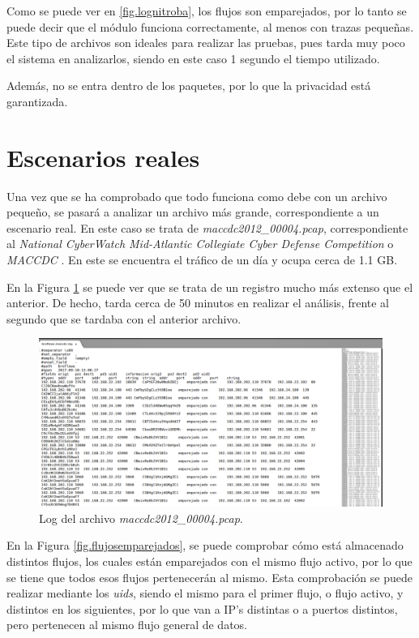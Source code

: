 \intro Como se puede ver en \ref{fig.lognitroba}, los flujos son emparejados, por lo tanto se puede decir que el módulo funciona 
correctamente, al menos con trazas pequeñas. Este tipo de archivos son ideales para realizar las pruebas, pues tarda muy poco el 
sistema en analizarlos, siendo en este caso 1 segundo el tiempo utilizado.

\intro Además, no se entra dentro de los paquetes, por lo que la privacidad está garantizada.

\section{Escenarios reales}

Una vez que se ha comprobado que todo funciona como debe con un archivo pequeño, se pasará a analizar un archivo más grande, 
correspondiente a un escenario real. En este caso se trata de \textit{maccdc2012\_00004.pcap}, correspondiente al \textit{National 
CyberWatch Mid-Atlantic Collegiate Cyber Defense Competition} o \textit{MACCDC} \cite{maccdc}. En este se encuentra el tráfico de un 
día y ocupa cerca de 1.1 GB.

\intro En la Figura \ref{fig.logmaccdc} se puede ver que se trata de un registro mucho más extenso que el anterior. De hecho, tarda 
cerca de 50 minutos en realizar el análisis, frente al segundo que se tardaba con el anterior archivo.

\begin{figure}[H]
  \includegraphics[width=1\textwidth]{imagenes/logmaccdc.png}
  \centering
  \caption{Log del archivo \textit{maccdc2012\_00004.pcap}.}\label{fig.logmaccdc}
\end{figure}

\intro En la Figura \ref{fig.flujosemparejados}, se puede comprobar cómo está almacenado distintos flujos, los cuales están 
emparejados con el mismo flujo activo, por lo que se tiene que todos esos flujos pertenecerán al mismo. Esta comprobación se puede 
realizar mediante los \textit{uids}, siendo el mismo para el primer flujo, o flujo activo, y distintos en los siguientes, por lo que 
van a IP's distintas o a puertos distintos, pero pertenecen al mismo flujo general de datos.

